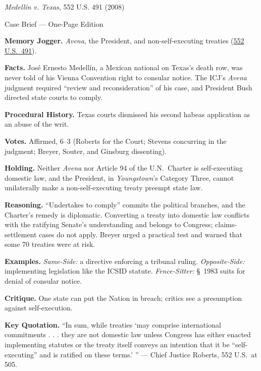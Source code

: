 \documentclass[12pt]{article}
\begin{document}
\begin{center}
{\Large \textit{Medell\'{i}n v. Texas}, 552 U.S. 491 (2008)\par}
\vspace{0.3em}
{\normalsize Case Brief --- One-Page Edition\par}
\end{center}

\textbf{Memory Jogger.} \textit{Avena}, the President, and non-self-executing treaties (\href{https://supreme.justia.com/cases/federal/us/552/491/}{552 U.S.\ 491}).

\textbf{Facts.} Jos\'{e} Ernesto Medell\'{i}n, a Mexican national on Texas's death row, was never told of his Vienna Convention right to consular notice. The ICJ's \textit{Avena} judgment required ``review and reconsideration'' of his case, and President Bush directed state courts to comply.

\textbf{Procedural History.} Texas courts dismissed his second habeas application as an abuse of the writ.

\textbf{Votes.} Affirmed, 6--3 (Roberts for the Court; Stevens concurring in the judgment; Breyer, Souter, and Ginsburg dissenting).

\textbf{Holding.} Neither \textit{Avena} nor Article 94 of the U.N.\ Charter is self-executing domestic law, and the President, in \textit{Youngstown}'s Category Three, cannot unilaterally make a non-self-executing treaty preempt state law.

\textbf{Reasoning.} ``Undertakes to comply'' commits the political branches, and the Charter's remedy is diplomatic. Converting a treaty into domestic law conflicts with the ratifying Senate's understanding and belongs to Congress; claims-settlement cases do not apply. Breyer urged a practical test and warned that some 70 treaties were at risk.

\textbf{Examples.} \emph{Same-Side:} a directive enforcing a tribunal ruling. \emph{Opposite-Side:} implementing legislation like the ICSID statute. \emph{Fence-Sitter:} \S\ 1983 suits for denial of consular notice.

\textbf{Critique.} One state can put the Nation in breach; critics see a presumption against self-execution.

\textbf{Key Quotation.} ``In sum, while treaties `may comprise international commitments . . . they are not domestic law unless Congress has either enacted implementing statutes or the treaty itself conveys an intention that it be ``self-executing'' and is ratified on these terms.' '' --- Chief Justice Roberts, 552 U.S.\ at 505.
\end{document}
